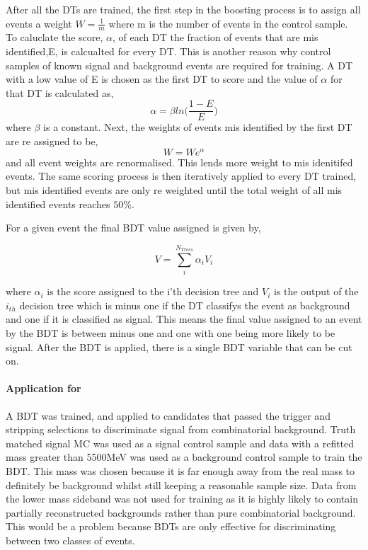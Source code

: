 After all the DTs are trained, the first step in the boosting process is to assign all events a weight $W=\frac{1}{m}$ where m is the number of events in the control sample.  To caluclate the score, $\alpha$, of each DT the fraction of events that are mis identified,E, is calcualted for every DT. This is another reason why control samples of known signal and background events are required for training.  A DT with a low value of E is chosen as the first DT to score and the value of $\alpha$ for that DT is calculated as,
\begin{equation}
  \alpha=\beta ln\big(\frac{1-E}{E}\big)
\end{equation}
where $\beta$ is a constant.  Next, the weights of events mis identified by the first DT are re assigned to be,
\begin{equation}
  W=W e^{\alpha}
\end{equation}
and all event weights are renormalised.  This lends more weight to mis idenitifed events. The same scoring process is then iteratively applied to every DT trained, but mis identified events are only re weighted until the total weight of all mis identified events reaches $50\%$. 

For a given event the final BDT value assigned is given by,

\begin{equation}
  V=\sum \limits_{i}^{N_{Trees}}\alpha_iV_i
\end{equation}

where $\alpha_i$ is the score assigned to the i'th decision tree and $V_i$ is the output of the $i_{th}$ decision tree which is minus one if the DT classifys the event as background and one if it is classified as signal.  This means the final value assigned to an event by the BDT is between minus one and one with one being more likely to be signal.  After the BDT is applied, there is a single BDT variable that can be cut on.

\paragraph{Application for \Bd \to \Kstar \etaz}
A BDT was trained, and applied to candidates that passed the trigger and stripping selections to discriminate signal from combinatorial background.  Truth matched signal MC was used as a signal control sample and data with a refitted \Bd mass greater than 5500MeV was used as a background control sample to train the BDT.  This mass was chosen because it is far enough away from the real \Bd mass to definitely be background whilst still keeping a reasonable sample size.  Data from the lower mass sideband was not used for training as it is highly likely to contain partially reconstructed backgrounds rather than pure combinatorial background.  This would be a problem because BDTs are only effective for discriminating between two classes of events.

